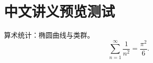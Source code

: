 \documentclass[fontset=fandol]{ctexart}
\begin{document}
\section*{中文讲义预览测试}
算术统计：椭圆曲线与类群。
\[
\sum_{n=1}^{\infty}\frac{1}{n^2}=\frac{\pi^2}{6}.
\]
\end{document}
